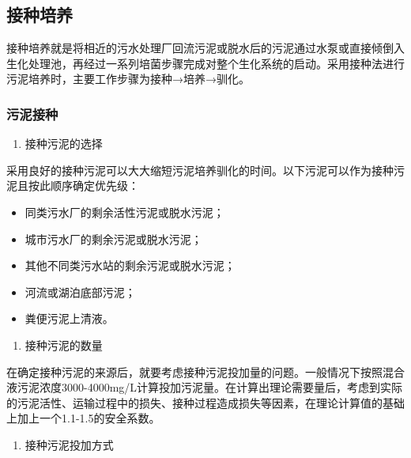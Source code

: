 \documentclass[]{book}
\providecommand{\tightlist}{%
  \setlength{\itemsep}{0pt}\setlength{\parskip}{0pt}}
\begin{document}
\hypertarget{ux63a5ux79cdux57f9ux517b}{%
\subsection{接种培养}\label{ux63a5ux79cdux57f9ux517b}}

接种培养就是将相近的污水处理厂回流污泥或脱水后的污泥通过水泵或直接倾倒入生化处理池，再经过一系列培菌步骤完成对整个生化系统的启动。采用接种法进行污泥培养时，主要工作步骤为接种→培养→驯化。

\hypertarget{ux6c61ux6ce5ux63a5ux79cd}{%
\subsubsection{污泥接种}\label{ux6c61ux6ce5ux63a5ux79cd}}

\begin{enumerate}
\def\labelenumi{\arabic{enumi}.}
\tightlist
\item
  接种污泥的选择
\end{enumerate}

采用良好的接种污泥可以大大缩短污泥培养驯化的时间。以下污泥可以作为接种污泥且按此顺序确定优先级：

\begin{itemize}
\item
  同类污水厂的剩余活性污泥或脱水污泥；
\item
  城市污水厂的剩余污泥或脱水污泥；
\item
  其他不同类污水站的剩余污泥或脱水污泥；
\item
  河流或湖泊底部污泥；
\item
  粪便污泥上清液。
\end{itemize}

\begin{enumerate}
\def\labelenumi{\arabic{enumi}.}
\setcounter{enumi}{1}
\tightlist
\item
  接种污泥的数量
\end{enumerate}

在确定接种污泥的来源后，就要考虑接种污泥投加量的问题。一般情况下按照混合液污泥浓度3000-4000mg/L计算投加污泥量。在计算出理论需要量后，考虑到实际的污泥活性、运输过程中的损失、接种过程造成损失等因素，在理论计算值的基础上加上一个1.1-1.5的安全系数。

\begin{enumerate}
\def\labelenumi{\arabic{enumi}.}
\setcounter{enumi}{2}
\tightlist
\item
  接种污泥投加方式
\end{enumerate}
\end{document}
